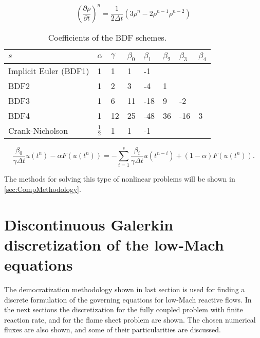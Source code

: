 \begin{equation}
	\left(\frac{\partial \rho}{\partial t} \right)^n= \frac{1}{2\Delta t}\left(3\rho^n-2\rho^{n-1}\rho^{n-2}\right)
\end{equation}
\begin{table}[t]
	\centering
	\begin{tabular}{llllllll}
		\hline
		$s$                   & $\alpha$      & $\gamma$ & $\beta_0$ & $\beta_1$ & $\beta_2$ & $\beta_3$ & $\beta_4$ \\ \hline
		Implicit Euler (BDF1) & 1             & 1        & 1         & -1        &           &           &           \\
		BDF2                  & 1             & 2        & 3         & -4        & 1         &           &           \\
		BDF3                  & 1             & 6        & 11        & -18       & 9         & -2        &           \\
		BDF4                  & 1             & 12       & 25        & -48       & 36        & -16       & 3         \\
		Crank-Nicholson       & $\frac{1}{2}$ & 1        & 1         & -1        &           &           &           \\ \hline
	\end{tabular}
	\caption{Coefficients of the BDF schemes.}
	\label{tab:my-table}
\end{table}
\begin{equation}
	\frac{\beta_0}{\gamma\Delta t}u(t^n)-\alpha F(u(t^n)) = - \sum_{i=1}^s \frac{\beta_i}{\gamma \Delta t}u(t^{n-i})+(1-\alpha)F(u(t^n)).
\end{equation}


The methods for solving this type of nonlinear problems will be shown in \cref{sec:CompMethodology}.
\section{Discontinuous Galerkin discretization of the low-Mach equations}
The democratization methodology shown in last section is used for finding a discrete formulation of the governing equations for low-Mach reactive flows. In the next sections the discretization for the fully coupled problem with finite reaction rate, and for the flame sheet problem are shown. The chosen numerical fluxes are also shown, and some of their particularities are discussed. 

